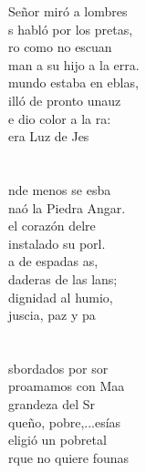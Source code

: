 \begin{cancion}%
	 Señor miró a lombres\\
	s habló por los pretas,\\
	ro como no escuan\\
	man a su hijo a la erra. \\
	 mundo estaba en eblas,\\
	illó de pronto unauz\\
	e dio color a la ra:\\
	era  Luz de Jes\\
	\jump\\
	    \\
	nde menos se esba\\
	naó la Piedra Angar.\\
	 el corazón delre\\
	 instalado su porl.\\
	a de espadas as,\\
	daderas de las lans;\\
	 dignidad al humio,\\
	juscia, paz y pa\\
	\jump\\
	   \\
	sbordados por sor\\
	proamamos con Maa \\
	 grandeza del Sr\\
	queño, pobre,...esías\\
	eligió un pobretal\\
	rque no quiere founas\\

\end{cancion}
